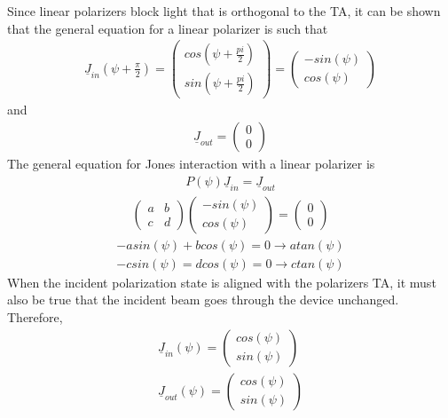 Since linear polarizers block light that is orthogonal to the TA, it can be shown that the general equation for a linear polarizer is such that
%
\begin{align}
    \underline{J}_{in}(\psi + \frac{\pi}{2}) =
    \begin{pmatrix}
        cos(\psi + \frac{pi}{2}) \\
        sin(\psi + \frac{pi}{2})
    \end{pmatrix}
    =
    \begin{pmatrix}
        -sin(\psi) \\
        cos(\psi)
    \end{pmatrix}
\end{align}
%
and
\begin{align}
    \underline{J}_{out} =
    \begin{pmatrix}
        0 \\
        0
    \end{pmatrix}
\end{align}
%
The general equation for Jones interaction with a linear polarizer is
%
\begin{align}
    P(\psi)\underline{J}_{in} = \underline{J}_{out}
\end{align}
\begin{align}
    \begin{pmatrix}
        a & b \\
        c & d
    \end{pmatrix}
    \begin{pmatrix}
        -sin(\psi) \\
        cos(\psi)
    \end{pmatrix}
    =
    \begin{pmatrix}
        0 \\
        0
    \end{pmatrix}
\end{align}
\begin{align}
    -asin(\psi) + bcos(\psi) = 0 \rightarrow atan(\psi) \\
    -csin(\psi) = dcos(\psi) = 0 \rightarrow ctan(\psi)
\end{align}
%
When the incident polarization state is aligned with the polarizers TA, it must also be true that the incident beam goes through the device unchanged.  Therefore,
%
\begin{align}
    \underline{J}_{in}(\psi) =
    \begin{pmatrix}
        cos(\psi) \\
        sin(\psi)
    \end{pmatrix} \\
    \underline{J}_{out}(\psi) =
    \begin{pmatrix}
        cos(\psi) \\
        sin(\psi)
    \end{pmatrix}
\end{align}
